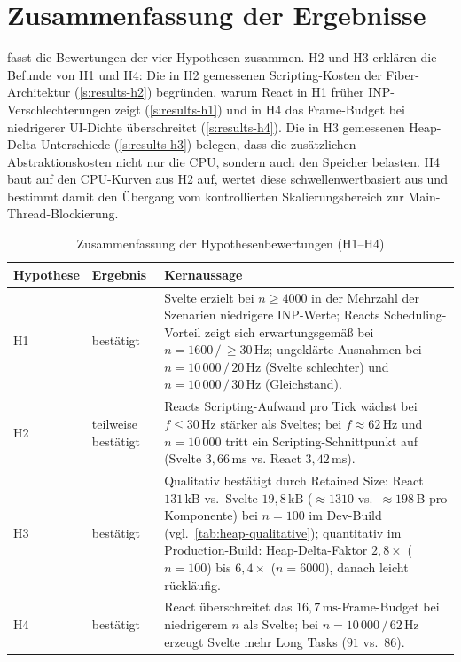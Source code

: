 \section{Zusammenfassung der Ergebnisse}
\label{s:results-summary}

 fasst die Bewertungen der vier Hypothesen zusammen. H2 und H3 erklären die Befunde von H1 und H4: Die in H2 gemessenen Scripting-Kosten der Fiber-Architektur (\cref{s:results-h2}) begründen, warum React in H1 früher INP-Verschlechterungen zeigt (\cref{s:results-h1}) und in H4 das Frame-Budget bei niedrigerer UI-Dichte überschreitet (\cref{s:results-h4}). Die in H3 gemessenen Heap-Delta-Unterschiede (\cref{s:results-h3}) belegen, dass die zusätzlichen Abstraktionskosten nicht nur die CPU, sondern auch den Speicher belasten. H4 baut auf den CPU-Kurven aus H2 auf, wertet diese schwellenwertbasiert aus und bestimmt damit den Übergang vom kontrollierten Skalierungsbereich zur Main-Thread-Blockierung.
\begin{table}[H]
  \centering
  \caption{Zusammenfassung der Hypothesenbewertungen (H1–H4)}
  \label{tab:hypotheses-summary}
  \small
  \begin{tabular}{llp{7.5cm}}
    \toprule
    \textbf{Hypothese} & \textbf{Ergebnis} & \textbf{Kernaussage} \\
    \midrule
    H1 & bestätigt &
      Svelte erzielt bei $n \geq 4000$ in der Mehrzahl der Szenarien niedrigere
      INP-Werte; Reacts Scheduling-Vorteil zeigt sich erwartungsgemäß bei
      $n = 1600\,/\,{\geq}30\,\text{Hz}$; ungeklärte Ausnahmen bei
      $n = 10\,000\,/\,20\,\text{Hz}$ (Svelte schlechter) und
      $n = 10\,000\,/\,30\,\text{Hz}$ (Gleichstand). \\[4pt]
    H2 & teilweise bestätigt &
      Reacts Scripting-Aufwand pro Tick wächst bei $f \leq 30\,\text{Hz}$ stärker
      als Sveltes; bei $f \approx 62\,\text{Hz}$ und $n = 10\,000$ tritt
      ein Scripting-Schnittpunkt auf (Svelte $3{,}66\,\text{ms}$ vs. React $3{,}42\,\text{ms}$). \\[4pt]
    H3 & bestätigt &
      Qualitativ bestätigt durch Retained Size: React $131\,\text{kB}$
      vs.\ Svelte $19{,}8\,\text{kB}$ (${\approx}1310$ vs.\ ${\approx}198$\,B
      pro Komponente) bei $n = 100$ im Dev-Build
      (vgl.~\cref{tab:heap-qualitative}); quantitativ im Production-Build:
      Heap-Delta-Faktor $2{,}8\times$ ($n = 100$) bis $6{,}4\times$
      ($n = 6000$), danach leicht rückläufig. \\[4pt]
    H4 & bestätigt &
      React überschreitet das $16{,}7\,\text{ms}$-Frame-Budget bei
      niedrigerem $n$ als Svelte; bei $n = 10\,000\,/\,62\,\text{Hz}$
      erzeugt Svelte mehr Long Tasks ($91$ vs.~$86$). \\
    \bottomrule
  \end{tabular}
\end{table}

